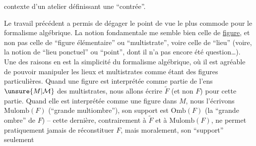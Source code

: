 contexte d'un atelier définissant une ``contrée''.

Le travail précédent a permis de dégager le point de vue le plus commode pour le formalisme algébrique. La notion fondamentale me semble bien celle de \uline{figure}, et non pas celle de ``figure élémentaire'' ou ``multistrate'', voire celle de ``lieu'' (voire, la notion de ``lieu ponctuel'' ou ``point'', dont il n'a pas encore été question\ldots). Une des raisons en est la simplicité du formalisme algébrique,
%
 où il est agréable de pouvoir manipuler les lieux et multistrates comme étant des figures particulières. Quand une figure  est interprétée  comme partie de l'ens $\unsure{M|\mathcal M}$  des multistrates, nous allons écrire $\widetilde F$ (et non $F$) pour cette partie. Quand elle est interprétée comme une figure  dans $M$, nous l'écrivons $\mathrm{Mulomb}(F)$ (``grande multiombre''), son support est $\mathrm{Omb}(F)$ (la ``grande ombre'' de $F$) -- cette dernière, contrairement à $\widetilde F$ et à $\mathrm{Mulomb}(F)$, ne permet pratiquement jamais de réconstituer $F$,  mais moralement, son ``support'' seulement
